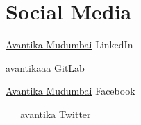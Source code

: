 \documentclass[]{twentysecondcv}
\begin{document}
\section{Social Media}
\begin{twenty}
  \twentyitem
  	{\faLinkedin \par}
  	{\href{https://www.linkedin.com/in/avantika-mudumbai-ba31171a6/}{Avantika Mudumbai}}
  	{LinkedIn}	
  	{}
  \twentyitem
  	{\faGithub \par}
  	{\href{https://gitlab.com/avantikaaa}{avantikaaa}}
  	{GitLab}	
  	{}
  \twentyitem
  	{\faFacebook \par}
  	{\href{https://www.facebook.com/avantika.mudumbai/}{Avantika Mudumbai}}
  	{Facebook}	
  	{}
  \twentyitem
  	{\faTwitter \par}
  	{\href{https://twitter.com/__avantika}{\_\_avantika}}
  	{Twitter}	
  	{}
\end{twenty}

\end{document}
